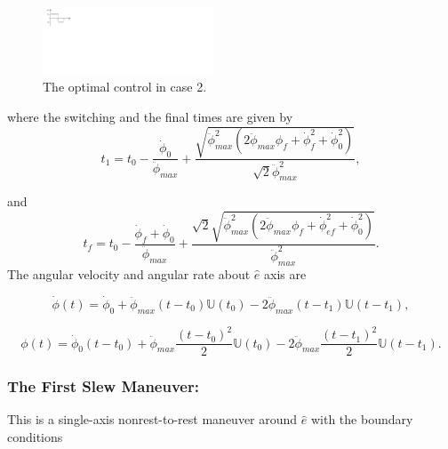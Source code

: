 \documentclass[journal ]{new-aiaa}
\begin{document}
	\begin{figure}[ht!]
	\centering
	\includegraphics[width=2in]{./Figures/Bang_bang}    
	\caption{The optimal control in case 2.}  
	\label{bang_bang}
	\end{figure}
	where the switching and the final times are given by
	\begin{equation}
	t_1=t_0-\frac{\dot{\phi}_{0}}{\ddot{\phi}_{max}}+\frac{\sqrt{\ddot{\phi}_{max}^2(2\ddot{\phi}_{max}\phi_{f}+\dot{\phi}_{f}^2+\dot{\phi}_{0}^2)}}{\sqrt{2}\ddot{\phi}_{max}^2},
	\end{equation}
	
	
	and
	\begin{equation}
	t_f=t_0-\frac{\dot{\phi}_{f}+\dot{\phi}_{0}}{\ddot{\phi}_{max}}+\frac{\sqrt{2}\sqrt{\ddot{\phi}_{max}^2(2\ddot{\phi}_{max}\phi_{f}+\dot{\phi}_{ef}^2+\dot{\phi}_{0}^2)}}{\ddot{\phi}_{max}^2}.
	\end{equation}
The angular velocity and angular rate about $\hat{e}$ axis are

	\begin{equation}\label{omega}
	\dot{\phi}(t)=\dot{\phi}_{0}+\ddot{\phi}_{max}(t-t_0)\mathbb{U}(t_0)- 2\ddot{\phi}_{max}(t-t_1)\mathbb{U}(t-t_1),
	\end{equation}

	\begin{equation}\label{phi}
	\phi(t)=\dot{\phi}_{0}(t-t_0)+\ddot{\phi}_{max}\frac{(t-t_0)^2}{2}\mathbb{U}(t_0)- 2\ddot{\phi}_{max}\frac{(t-t_1)^2}{2}\mathbb{U}(t-t_1).
	\end{equation}
	
	
	\subsubsection{The First Slew Maneuver:} 
	This is a single-axis nonrest-to-rest maneuver around $\hat{e}$ with the boundary conditions
\end{document}
